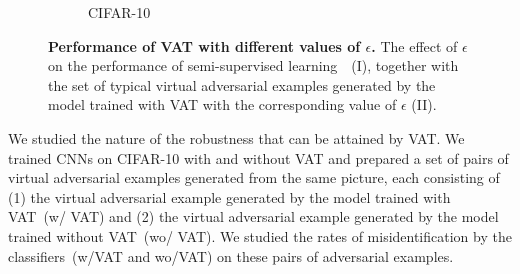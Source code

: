\documentclass[10pt,journal,compsoc]{IEEEtran}
\begin{document}
\begin{figure}
\begin{subfigure}{0.35\textwidth}
	\caption{\label{fig:cifar10_epsilon_vae}CIFAR-10}
    \end{subfigure}
    \hspace*{\fill}%
    \caption{\label{fig:epsilon_vae} \textbf{Performance of VAT with different values of $\epsilon$.}   The effect of $\epsilon$ on the performance of semi-supervised learning　(I), together with the set of typical virtual adversarial examples generated by the model trained with VAT with the corresponding value of $\epsilon$ (II). }
\end{figure}
We studied the nature of the robustness that can be attained by VAT.
We trained CNNs on CIFAR-10 with and without VAT and prepared a set of pairs of virtual adversarial examples generated from the same picture, each consisting of (1) the virtual adversarial example generated by the model trained with VAT~(w/ VAT) and (2) the virtual adversarial example generated by the model trained without VAT~(wo/ VAT).
We studied the rates of misidentification by the classifiers~(w/VAT and wo/VAT) on these pairs of adversarial examples.
\end{document}
